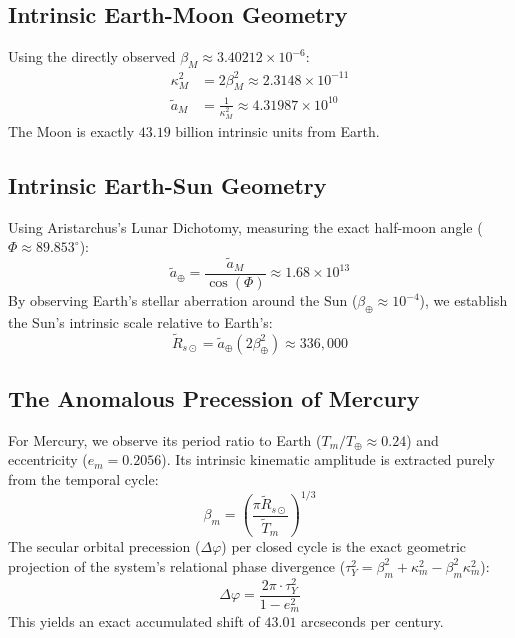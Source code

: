 \documentclass[11pt, a4paper]{article}
\begin{document}
\subsection{Intrinsic Earth-Moon Geometry}
Using the directly observed $\beta_M \approx 3.40212 \times 10^{-6}$:
\begin{align}
    \kappa_M^2 &= 2\beta_M^2 \approx 2.3148 \times 10^{-11} \\
    \tilde{a}_M &= \frac{1}{\kappa_M^2} \approx 4.31987 \times 10^{10}
\end{align}
The Moon is exactly $43.19$ billion intrinsic units from Earth.

\subsection{Intrinsic Earth-Sun Geometry}
Using Aristarchus's Lunar Dichotomy, measuring the exact half-moon angle ($\Phi \approx 89.853^\circ$):
\begin{equation}
    \tilde{a}_\oplus = \frac{\tilde{a}_M}{\cos(\Phi)} \approx 1.68 \times 10^{13}
\end{equation}
By observing Earth's stellar aberration around the Sun ($\beta_\oplus \approx 10^{-4}$), we establish the Sun's intrinsic scale relative to Earth's:
\begin{equation}
    \tilde{R}_{s\odot} = \tilde{a}_\oplus (2\beta_\oplus^2) \approx 336,000
\end{equation}

\subsection{The Anomalous Precession of Mercury}
For Mercury, we observe its period ratio to Earth ($T_m / T_\oplus \approx 0.24$) and eccentricity ($e_m = 0.2056$). Its intrinsic kinematic amplitude is extracted purely from the temporal cycle:
\begin{equation}
    \beta_m = \left( \frac{\pi \tilde{R}_{s\odot}}{\tilde{T}_m} \right)^{1/3}
\end{equation}
The secular orbital precession ($\Delta\varphi$) per closed cycle is the exact geometric projection of the system's relational phase divergence ($\tau_Y^2 = \beta_m^2 + \kappa_m^2 - \beta_m^2\kappa_m^2$):
\begin{equation}
    \Delta\varphi = \frac{2\pi \cdot \tau_Y^2}{1-e_m^2}
\end{equation}
This yields an exact accumulated shift of $43.01$ arcseconds per century.
\end{document}
